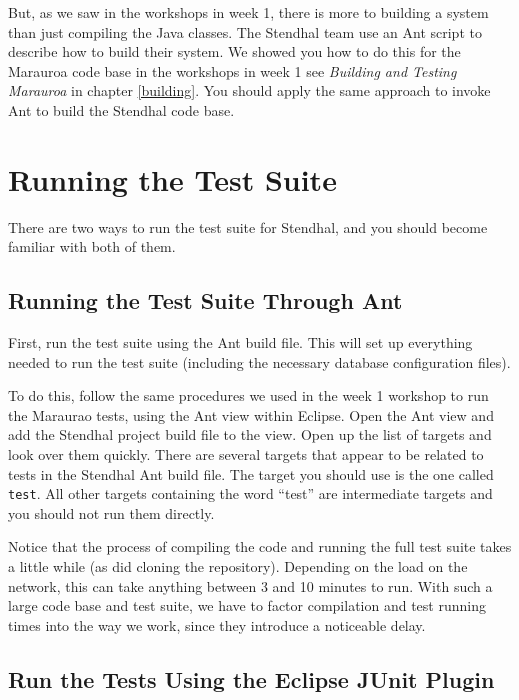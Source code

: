 \documentclass[
]{book}
\begin{document}
But, as we saw in the workshops in week 1, there is more to building a system than just compiling the Java classes. The Stendhal team use an Ant script to describe how to build their system. We showed you how to do this for the Marauroa code base in the workshops in week 1 see \emph{Building and Testing Marauroa} in chapter \ref{building}. You should apply the same approach to invoke Ant to build the Stendhal code base.

\hypertarget{testsuites}{%
\section{Running the Test Suite}\label{testsuites}}

There are two ways to run the test suite for Stendhal, and you should become familiar with both of them.

\hypertarget{antrunning}{%
\subsection{Running the Test Suite Through Ant}\label{antrunning}}

First, run the test suite using the Ant build file. This will set up everything needed to run the test suite (including the necessary database configuration files).

To do this, follow the same procedures we used in the week 1 workshop to run the Maraurao tests, using the Ant view within Eclipse. Open the Ant view and add the Stendhal project build file to the view. Open up the list of targets and look over them quickly. There are several targets that appear to be related to tests in the Stendhal Ant build file. The target you should use is the one called \texttt{test}. All other targets containing the word ``test'' are intermediate targets and you should not run them directly.

Notice that the process of compiling the code and running the full test suite takes a little while (as did cloning the repository). Depending on the load on the network, this can take anything between 3 and 10 minutes to run. With such a large code base and test suite, we have to factor compilation and test running times into the way we work, since they introduce a noticeable delay.

\hypertarget{junitplugin}{%
\subsection{Run the Tests Using the Eclipse JUnit Plugin}\label{junitplugin}}
\end{document}
